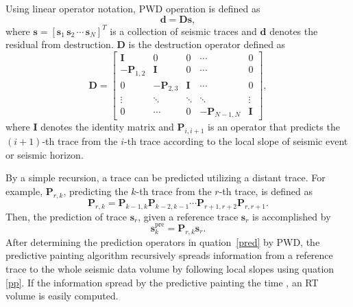     Using linear operator notation, PWD operation is defined as
    \begin{equation}
        \mathbf{d} = \mathbf{D}{}\mathbf{s},
    \end{equation}
    where $\mathbf{s} =[\mathbf{s}_1 \,\mathbf{s}_2 \,\cdots\, \mathbf{s}_N]^T$ 
    is a collection of seismic traces and $\mathbf{d}$ denotes the residual from 
    destruction. $\mathbf{D}$ is the destruction operator defined as 
    \begin{equation}
        \label{pred}
        \mathbf{D}=
        \begin{bmatrix}
            \mathbf{I} & 0 & 0 & \cdots & 0 \\
            -\mathbf{P}_{1,2} & \mathbf{I} & 0 & \cdots & 0 \\
            0 & -\mathbf{P}_{2,3} & \mathbf{I} & \cdots & 0 \\
            \vdots & \ddots & \ddots & \ddots & \vdots \\
            0 & \cdots & 0 & -\mathbf{P}_{N-1,N} & \mathbf{I}
        \end{bmatrix},
    \end{equation}
    where $\mathbf{I}$ denotes the identity matrix and $\mathbf{P}_{i,i+1}$ is 
    an operator that predicts the $(i+1)$-th trace from the $i$-th trace 
    according to the local slope of seismic event or seismic horizon.

    By a simple recursion, a trace can be predicted utilizing a distant trace. 
    For example, $\mathbf{P}_{r,k}$, predicting the $k$-th trace from the $r$-th 
    trace, is defined as
    \begin{equation}
        \label{predict}
        \mathbf{P}_{r,k}=\mathbf{P}_{k-1,k}\mathbf{P}_{k-2,k-1}\cdots
        \mathbf{P}_{r+1,r+2}\mathbf{P}_{r,r+1}.
    \end{equation}
    Then, the prediction of trace $\mathbf{s}_r$, given a reference trace
    $\mathbf{s}_r$ is accomplished by
    \begin{equation}
        \label{pp}
        \mathbf{s}_k^{\text{pre}}=\mathbf{P}_{r,k}\mathbf{s}_r.
    \end{equation}
    After determining the prediction operators in 
    quation~\ref{pred} by PWD, 
    the predictive painting algorithm recursively spreads information from a 
    reference trace to the whole seismic data volume by following local slopes
    using quation \ref{pp}. 
    If the information spread by the predictive painting  the time , an 
    RT volume is easily computed.

